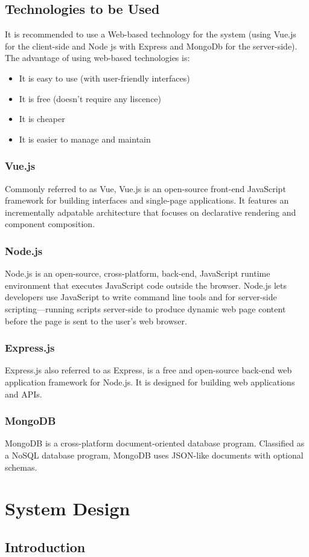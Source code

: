 \documentclass[twoside, a4paper, 12pt]{report}
\begin{document}
\section{Technologies to be Used}
It is recommended to use a Web-based technology for the system (using Vue.js for the client-side and Node js with Express and MongoDb for the server-side). The advantage of using web-based technologies is:
\begin{itemize}
	\item It is easy to use (with user-friendly interfaces)
	\item It is free (doesn't require any liscence)
	\item It is cheaper
	\item It is easier to manage and maintain
\end{itemize}

\subsection{Vue.js}
Commonly referred to as Vue, Vue.js is an open-source front-end JavaScript framework for building interfaces and single-page applications. It features an incrementally adpatable architecture that focuses on declarative rendering and component composition.

\subsection{Node.js}
Node.js is an open-source, cross-platform, back-end, JavaScript runtime environment that executes JavaScript code outside the browser. Node.js lets developers use JavaScript to write command line tools and for server-side scripting—running scripts server-side to produce dynamic web page content before the page is sent to the user's web browser.

\subsection{Express.js}
Express.js also referred to as Express, is a free and open-source back-end web application framework for Node.js. It is designed for building web applications and APIs.

\subsection{MongoDB}
MongoDB is a cross-platform document-oriented database program. Classified as a NoSQL database program, MongoDB uses JSON-like documents with optional schemas.

\chapter{System Design}
\section{Introduction}

\printbibliography
\end{document}
